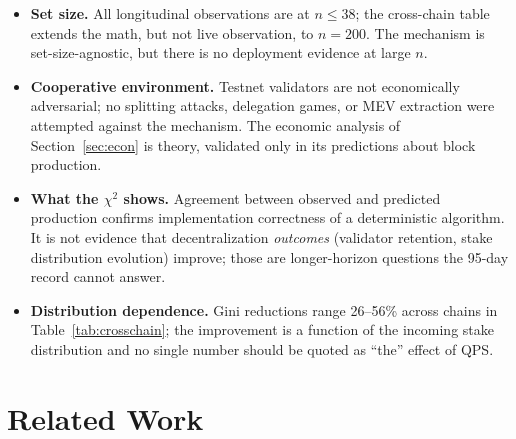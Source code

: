 \documentclass[11pt,a4paper]{article}
\begin{document}
\begin{itemize}
    \item \textbf{Set size.} All longitudinal observations are at $n \le 38$; the cross-chain table extends the math, but not live observation, to $n = 200$. The mechanism is set-size-agnostic, but there is no deployment evidence at large $n$.
    \item \textbf{Cooperative environment.} Testnet validators are not economically adversarial; no splitting attacks, delegation games, or MEV extraction were attempted against the mechanism. The economic analysis of Section~\ref{sec:econ} is theory, validated only in its predictions about block production.
    \item \textbf{What the $\chi^2$ shows.} Agreement between observed and predicted production confirms implementation correctness of a deterministic algorithm. It is not evidence that decentralization \emph{outcomes} (validator retention, stake distribution evolution) improve; those are longer-horizon questions the 95-day record cannot answer.
    \item \textbf{Distribution dependence.} Gini reductions range 26--56\% across chains in Table~\ref{tab:crosschain}; the improvement is a function of the incoming stake distribution and no single number should be quoted as ``the'' effect of QPS.
\end{itemize}

\section{Related Work}
\label{sec:related}
\end{document}
